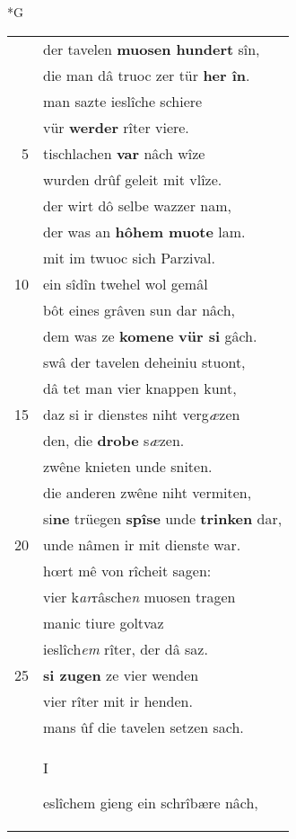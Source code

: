 \documentclass[8pt,a4paper,notitlepage]{article}
\begin{document}
\begin{table}[ht]
\begin{minipage}[t]{0.5\linewidth}
\small
\begin{center}*G
\end{center}
\begin{tabular}{rl}
 & der tavelen \textbf{muosen hundert} sîn,\\ 
 & die man dâ truoc zer tür \textbf{her în}.\\ 
 & man sazte ieslîche schiere\\ 
 & vür \textbf{werder} rîter viere.\\ 
5 & tischlachen \textbf{var} nâch wîze\\ 
 & wurden drûf geleit mit vlîze.\\ 
 & der wirt dô selbe wazzer nam,\\ 
 & der was an \textbf{hôhem muote} lam.\\ 
 & mit im twuoc sich Parzival.\\ 
10 & ein sîdîn twehel wol gemâl\\ 
 & bôt eines grâven sun dar nâch,\\ 
 & dem was ze \textbf{komene} \textbf{vür si} gâch.\\ 
 & swâ der tavelen deheiniu stuont,\\ 
 & dâ tet man vier knappen kunt,\\ 
15 & daz si ir dienstes niht verg\textit{æ}zen\\ 
 & den, die \textbf{drobe} s\textit{æ}zen.\\ 
 & zwêne knieten unde sniten.\\ 
 & die anderen zwêne niht vermiten,\\ 
 & si\textbf{ne} trüegen \textbf{spîse} unde \textbf{trinken} dar,\\ 
20 & unde nâmen ir mit dienste war.\\ 
 & hœrt mê von rîcheit sagen:\\ 
 & vier k\textit{ar}râsche\textit{n} muosen tragen\\ 
 & manic tiure goltvaz\\ 
 & ieslîch\textit{em} rîter, der dâ saz.\\ 
25 & \textbf{si zugen} ze vier wenden\\ 
 & vier rîter mit ir henden.\\ 
 & mans ûf die tavelen setzen sach.\\ 
 & \begin{large}I\end{large}eslîchem gieng ein schrîbære nâch,\\ 

\end{tabular}
\end{minipage}
\end{table}
\end{document}
